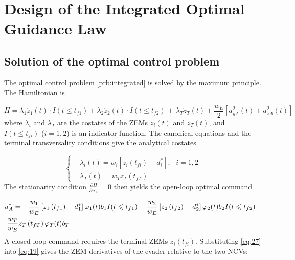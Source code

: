 \section{Design of the Integrated Optimal Guidance Law}
\subsection{Solution of the optimal control problem}
The optimal control problem \cref{prb:integrated} is solved by the maximum principle. The Hamiltonian is

\begin{equation}
\label{eq:25}
H = {\lambda _1}{\dot z_1}(t) \cdot I(t \leqslant {t_{f1}}) + {\lambda _2}{\dot z_2}(t) \cdot I(t \leqslant {t_{f2}}){\text{ + }}{\lambda _T}{\dot z_T}(t) + \frac{{{w_E}}}{2}\left[ {a_{yA}^2(t) + a_{zA}^2(t)} \right]
\end{equation}
where ${\lambda _i}$ and ${\lambda _T}$ are the costates of the ZEMs ${z_i}(t)$ and ${z_T}(t)$, and $I(t \leqslant {t_{fi}})$ ($i = 1,2$) is an indicator function. The canonical equations and the terminal transversality conditions give the analytical costates

\begin{equation}
\label{eq:26}
\left\{
\begin{aligned}
& {\lambda _i}\left( t \right) = {w_i}\left[ {z_i\left( {{t_{fi}}} \right) - d_i^*} \right],{\text{ }}i = 1,2 \\
& {\lambda _T}\left( t \right) = {w_T}{z_T}\left( {{t_{fT}}} \right)
\end{aligned}
\right.
\end{equation}
The stationarity condition $\frac{{\partial H}}{{\partial {u_A}}} = 0$ then yields the open-loop optimal command

\begin{equation}
\label{eq:27}
\begin{gathered}
  u_A^* =  - \frac{{{w_1}}}{{{w_E}}}\left[ {{z_1}\left( {{t_{f1}}} \right) - d_1^*} \right]{\varphi _1}(t){b_1}I(t \leqslant {t_{f1}}) - \frac{{{w_2}}}{{{w_E}}}\left[ {{z_2}\left( {{t_{f2}}} \right) - d_2^*} \right]{\varphi _2}(t){b_2}I(t \leqslant {t_{f2}}) -  \hfill \\
  {\text{    }}\frac{{{w_T}}}{{{w_E}}}{z_T}\left( {{t_{fT}}} \right){\varphi _T}(t){b_T} \hfill \\ 
\end{gathered}
\end{equation}
A closed-loop command requires the terminal ZEMs ${z_i}({t_{fi}})$. Substituting \eqref{eq:27} into \eqref{eq:19} gives the ZEM derivatives of the evader relative to the two NCVs:

